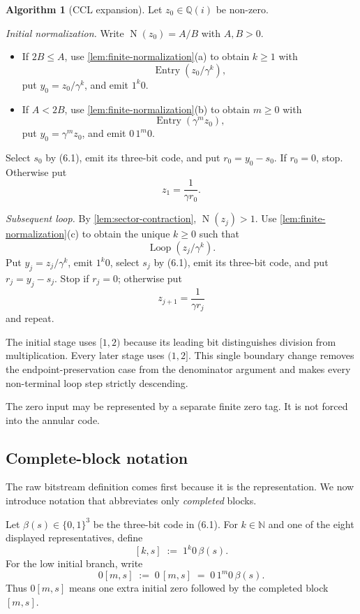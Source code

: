\documentclass[10pt]{article}
\theoremstyle{definition}
\newtheorem{algorithm}[theorem]{Algorithm}
\theoremstyle{remark}
\newcommand{\N}{\mathbb{N}}
\newcommand{\Qi}{\mathbb{Q}(i)}
\newcommand{\Norm}{\operatorname{N}}
\newcommand{\bits}{\{0,1\}}
\newcommand{\code}{\beta}
\begin{document}
\begin{algorithm}[CCL expansion]\label{alg:ccl}
Let $z_0\in\Qi$ be non-zero.

\emph{Initial normalization.}  Write $\Norm(z_0)=A/B$ with $A,B>0$.
\begin{itemize}
\item If $2B\le A$, use \autoref{lem:finite-normalization}(a) to obtain $k\ge1$ with
\[
 \operatorname{Entry}(z_0/\gamma^k),
\]
put $y_0=z_0/\gamma^k$, and emit $1^k0$.
\item If $A<2B$, use \autoref{lem:finite-normalization}(b) to obtain $m\ge0$ with
\[
 \operatorname{Entry}(\gamma^mz_0),
\]
put $y_0=\gamma^mz_0$, and emit $0\,1^m0$.
\end{itemize}
Select $s_0$ by (6.1), emit its three-bit code, and put $r_0=y_0-s_0$.  If $r_0=0$, stop.  Otherwise put
\[
 z_1=\frac1{\gamma r_0}.
\]

\emph{Subsequent loop.}  By \autoref{lem:sector-contraction}, $\Norm(z_j)>1$.  Use \autoref{lem:finite-normalization}(c) to obtain the unique $k\ge0$ such that
\[
 \operatorname{Loop}(z_j/\gamma^k).
\]
Put $y_j=z_j/\gamma^k$, emit $1^k0$, select $s_j$ by (6.1), emit its three-bit code, and put $r_j=y_j-s_j$.  Stop if $r_j=0$; otherwise put
\[
 z_{j+1}=\frac1{\gamma r_j}
\]
and repeat.
\end{algorithm}

The initial stage uses $[1,2)$ because its leading bit distinguishes division from multiplication.  Every later stage uses $(1,2]$.  This single boundary change removes the endpoint-preservation case from the denominator argument and makes every non-terminal loop step strictly descending.

The zero input may be represented by a separate finite zero tag.  It is not forced into the annular code.

\subsection{Complete-block notation}

The raw bitstream definition comes first because it is the representation.  We now introduce notation that abbreviates only \emph{completed} blocks.

Let $\code(s)\in\bits^3$ be the three-bit code in (6.1).  For $k\in\N$ and one of the eight displayed representatives, define
\[
 [k,s]\;:=\;1^k0\,\code(s).
\]
For the low initial branch, write
\[
 0[m,s]\;:=\;0\,[m,s]\;=\;0\,1^m0\,\code(s).
\]
Thus $0[m,s]$ means one extra initial zero followed by the completed block $[m,s]$.
\end{document}

